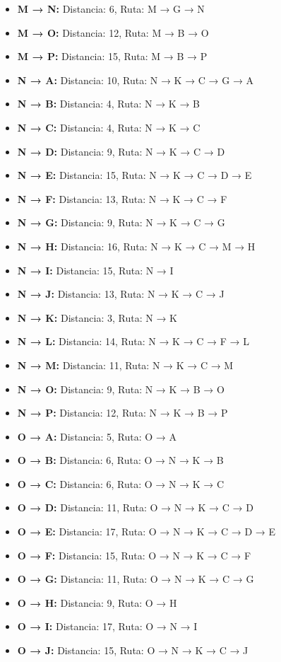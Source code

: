 \documentclass[12pt]{article}
\begin{document}
\begin{itemize}
\item \textbf{M → N:} Distancia: 6, Ruta: M → G → N
\item \textbf{M → O:} Distancia: 12, Ruta: M → B → O
\item \textbf{M → P:} Distancia: 15, Ruta: M → B → P
\item \textbf{N → A:} Distancia: 10, Ruta: N → K → C → G → A
\item \textbf{N → B:} Distancia: 4, Ruta: N → K → B
\item \textbf{N → C:} Distancia: 4, Ruta: N → K → C
\item \textbf{N → D:} Distancia: 9, Ruta: N → K → C → D
\item \textbf{N → E:} Distancia: 15, Ruta: N → K → C → D → E
\item \textbf{N → F:} Distancia: 13, Ruta: N → K → C → F
\item \textbf{N → G:} Distancia: 9, Ruta: N → K → C → G
\item \textbf{N → H:} Distancia: 16, Ruta: N → K → C → M → H
\item \textbf{N → I:} Distancia: 15, Ruta: N → I
\item \textbf{N → J:} Distancia: 13, Ruta: N → K → C → J
\item \textbf{N → K:} Distancia: 3, Ruta: N → K
\item \textbf{N → L:} Distancia: 14, Ruta: N → K → C → F → L
\item \textbf{N → M:} Distancia: 11, Ruta: N → K → C → M
\item \textbf{N → O:} Distancia: 9, Ruta: N → K → B → O
\item \textbf{N → P:} Distancia: 12, Ruta: N → K → B → P
\item \textbf{O → A:} Distancia: 5, Ruta: O → A
\item \textbf{O → B:} Distancia: 6, Ruta: O → N → K → B
\item \textbf{O → C:} Distancia: 6, Ruta: O → N → K → C
\item \textbf{O → D:} Distancia: 11, Ruta: O → N → K → C → D
\item \textbf{O → E:} Distancia: 17, Ruta: O → N → K → C → D → E
\item \textbf{O → F:} Distancia: 15, Ruta: O → N → K → C → F
\item \textbf{O → G:} Distancia: 11, Ruta: O → N → K → C → G
\item \textbf{O → H:} Distancia: 9, Ruta: O → H
\item \textbf{O → I:} Distancia: 17, Ruta: O → N → I
\item \textbf{O → J:} Distancia: 15, Ruta: O → N → K → C → J

\end{itemize}
\end{document}
